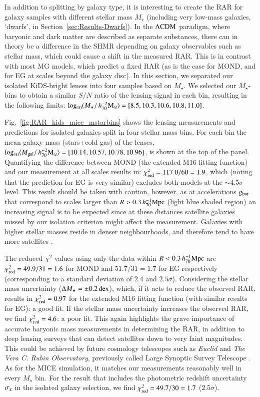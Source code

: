\documentclass{aa}
\newcommand{\hmsun}{\,h_{70}^{-2} {\rm M_\odot}}
\newcommand{\hMpc}{\,h_{70}^{-1}{\rm{Mpc}} }
\newcommand{\dex}{\,{\rm dex}}
\renewcommand{\Updelta}{{\rm \Delta}}
\newcommand{\lan}{\langle}
\newcommand{\ran}{\rangle}
\newcommand{\lcdm}{{\rm \Lambda CDM}}
\newcommand{\un}[1]{_{\rm #1}}
\begin{document}
In addition to splitting by galaxy type, it is interesting to create the RAR for galaxy samples with different stellar mass $M_\star$ (including very low-mass galaxies, `dwarfs', in Section~\ref{sec:Results-Dwarfs}). In the $\lcdm$ paradigm, where baryonic and dark matter are described as separate substances, there can in theory be a difference in the SHMR depending on galaxy observables such as stellar mass, which could cause a shift in the measured RAR. This is in contrast with most MG models, which predict a fixed RAR (as is the case for MOND, and for EG at scales beyond the galaxy disc). In this section, we separated our isolated KiDS-bright lenses into four samples based on $M_\star$. We selected our $M_\star$-bins to obtain a similar $S/N$ ratio of the lensing signal in each bin, resulting in the following limits: $\log_{10}(M_\star/\hmsun) = [8.5,10.3,10.6,10.8,11.0]$. 

Fig.~\ref{fig:RAR_kids_mice_mstarbins} shows the lensing measurements and predictions for isolated galaxies split in four stellar mass bins. For each bin the mean galaxy mass (stars+cold gas) of the lenses, $\log_{10}\lan M\un{gal}/\hmsun \ran = [10.14, 10.57, 10.78, 10.96]$, is shown at the top of the panel. Quantifying the difference between MOND (the extended M16 fitting function) and our measurement at all scales results in: $\chi\un{red}^2 = 117.0 / 60 = 1.9$, which (noting that the prediction for EG is very similar) excludes both models at the $\sim4.5 \sigma$ level. This result should be taken with caution, however, as at accelerations $g\un{bar}$ that correspond to scales larger than $R > 0.3 \hMpc$ (light blue shaded region) an increasing signal is to be expected since at these distances satellite galaxies missed by our isolation criterion might affect the measurement. Galaxies with higher stellar masses reside in denser neighbourhoods, and therefore tend to have more satellites \cite[see e.g.][]{baldry2006, bolzonella2010, brouwer2016}.

The reduced $\chi^2$ values using only the data within $R < 0.3 \hMpc$ are $\chi\un{red}^2 = 49.9 / 31 = 1.6$ for MOND and $51.7 / 31 = 1.7$ for EG respectively (corresponding to a standard deviation of $2.4$ and $2.5\sigma$). Considering the stellar mass uncertainty ($\Updelta M_\star=\pm0.2 \dex$), which, if it acts to reduce the observed RAR, results in $\chi\un{red}^2 = 0.97$ for the extended M16 fitting function (with similar results for EG): a good fit. If the stellar mass uncertainty increases the observed RAR, we find $\chi\un{red}^2=4.6$: a poor fit. This again highlights the grave importance of accurate baryonic mass measurements in determining the RAR, in addition to deep lensing surveys that can detect satellites down to very faint magnitudes. This could be achieved by future cosmology telescopes such as \emph{Euclid} \cite[]{laureijs2011} and \emph{The Vera C. Rubin Observatory}, previously called Large Synoptic Survey Telescope \cite[LSST;][]{lsst2012}. As for the MICE simulation, it matches our measurements reasonably well in every $M_\star$ bin. For the result that includes the photometric redshift uncertainty $\sigma\un{z}$ in the isolated galaxy selection, we find $\chi\un{red}^2 = 49.7 / 30 = 1.7$ ($2.5 \sigma$).
\end{document}
